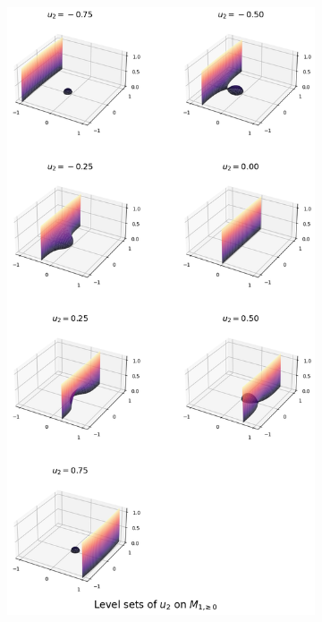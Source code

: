 \documentclass[titlepage,numbers=noenddot,oneside,%
cleardoublepage=empty,paper=a4,fontsize=11pt,%
english,%
]{scrartcl}
\begin{document}
\begin{figure}
    \centering
    \begin{subfigure}{.49\textwidth}
        \includegraphics[width=\textwidth]{figures/level_sets_u2_unmodified.png}
    \end{subfigure}

\end{figure}
\end{document}
